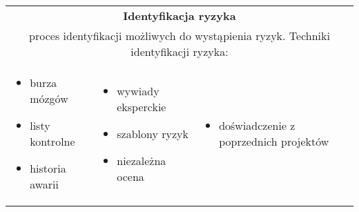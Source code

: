 \documentclass[../main.tex]{subfiles}
\begin{document}
    \begin{table}[H]
        \begin{center}
            \begin{tabular}{| p{5cm} p{5cm} p{5cm} |}
                \hline
                \multicolumn{3}{|c|}{\textbf{Identyfikacja ryzyka}} \\
                \multicolumn{3}{|c|}{proces identyfikacji możliwych do wystąpienia ryzyk. Techniki identyfikacji
                ryzyka:} \\
                \hline
                \begin{itemize}
                    \item burza mózgów
                    \item listy kontrolne
                    \item historia awarii
                \end{itemize}
                &
                \begin{itemize}
                    \item wywiady eksperckie
                    \item szablony ryzyk
                    \item niezależna ocena
                \end{itemize}
                &
                \begin{itemize}
                    \item doświadczenie z poprzednich projektów
                \end{itemize} \\
                \hline
            \end{tabular}
        \end{center}
    \end{table}
\end{document}

